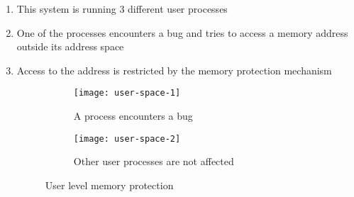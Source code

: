 \begin{enumerate}
\item This system is running 3 different user processes
\item One of the processes encounters a bug and tries to access a memory address outside its address space
\item Access to the address is restricted by the memory protection mechanism
\begin{figure}[!ht]
    \centering
    \begin{subfigure}[b]{0.49\textwidth}
	\texttt{[image: user-space-1]}
	\caption{A process encounters a bug}
    \end{subfigure}
	\hfill
    \begin{subfigure}[b]{0.49\textwidth}
	\texttt{[image: user-space-2]}
	\caption{Other user processes are not affected}
    \end{subfigure}
    \caption{User level memory protection}\label{fig:User space}
\end{figure}
\end{enumerate}

